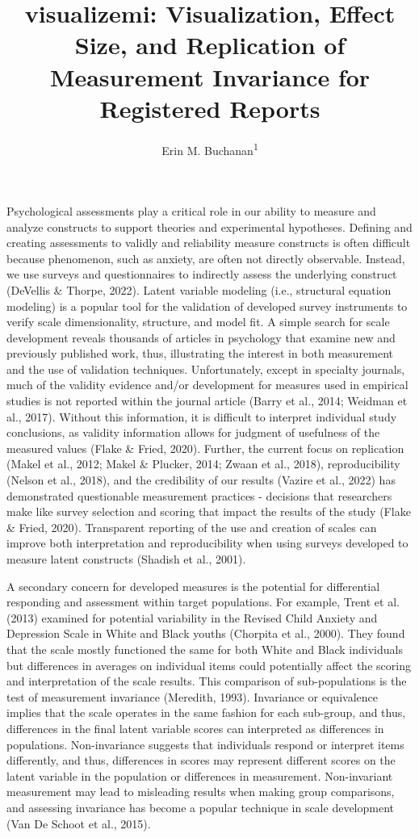 \documentclass[
  man]{apa7}
\title{visualizemi: Visualization, Effect Size, and Replication of Measurement Invariance for Registered Reports}
\author{Erin M. Buchanan\textsuperscript{1}}
\date{}
\affiliation{\vspace{0.5cm}\textsuperscript{1} Harrisburg University of Science and Technology}
\begin{document}
\maketitle

Psychological assessments play a critical role in our ability to measure and analyze constructs to support theories and experimental hypotheses. Defining and creating assessments to validly and reliability measure constructs is often difficult because phenomenon, such as anxiety, are often not directly observable. Instead, we use surveys and questionnaires to indirectly assess the underlying construct (DeVellis \& Thorpe, 2022). Latent variable modeling (i.e., structural equation modeling) is a popular tool for the validation of developed survey instruments to verify scale dimensionality, structure, and model fit. A simple search for scale development reveals thousands of articles in psychology that examine new and previously published work, thus, illustrating the interest in both measurement and the use of validation techniques. Unfortunately, except in specialty journals, much of the validity evidence and/or development for measures used in empirical studies is not reported within the journal article (Barry et al., 2014; Weidman et al., 2017). Without this information, it is difficult to interpret individual study conclusions, as validity information allows for judgment of usefulness of the measured values (Flake \& Fried, 2020). Further, the current focus on replication (Makel et al., 2012; Makel \& Plucker, 2014; Zwaan et al., 2018), reproducibility (Nelson et al., 2018), and the credibility of our results (Vazire et al., 2022) has demonstrated questionable measurement practices - decisions that researchers make like survey selection and scoring that impact the results of the study (Flake \& Fried, 2020). Transparent reporting of the use and creation of scales can improve both interpretation and reproducibility when using surveys developed to measure latent constructs (Shadish et al., 2001).

A secondary concern for developed measures is the potential for differential responding and assessment within target populations. For example, Trent et al. (2013) examined for potential variability in the Revised Child Anxiety and Depression Scale in White and Black youths (Chorpita et al., 2000). They found that the scale mostly functioned the same for both White and Black individuals but differences in averages on individual items could potentially affect the scoring and interpretation of the scale results. This comparison of sub-populations is the test of measurement invariance (Meredith, 1993). Invariance or equivalence implies that the scale operates in the same fashion for each sub-group, and thus, differences in the final latent variable scores can interpreted as differences in populations. Non-invariance suggests that individuals respond or interpret items differently, and thus, differences in scores may represent different scores on the latent variable in the population or differences in measurement. Non-invariant measurement may lead to misleading results when making group comparisons, and assessing invariance has become a popular technique in scale development (Van De Schoot et al., 2015).
\end{document}
